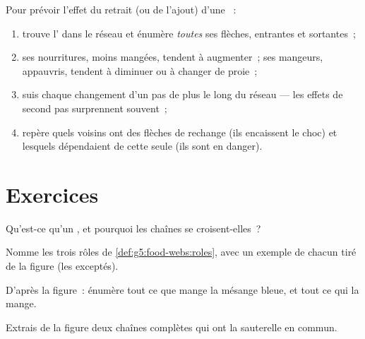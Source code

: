 \begin{method}\label{met:g5:food-webs:predict}
Pour prévoir l'effet du retrait (ou de l'ajout) d'une ~:
\begin{enumerate}
  \item trouve l' dans le réseau et énumère \emph{toutes} ses
        flèches, entrantes et sortantes~;
  \item ses nourritures, moins mangées, tendent à augmenter~; ses
        mangeurs, appauvris, tendent à diminuer ou à changer de
        proie~;
  \item suis chaque changement d'un pas de plus le long du réseau
        --- les effets de second pas surprennent souvent~;
  \item repère quels voisins ont des flèches de rechange (ils
        encaissent le choc) et lesquels dépendaient de cette seule
         (ils sont en danger).
\end{enumerate}
\end{method}

\section{Exercices}

\begin{exercise}[$\star$]\label{exo:g5:food-webs:1}
Qu'est-ce qu'un , et pourquoi les chaînes se
croisent-elles~?
\end{exercise}

\begin{exercise}[$\star$]\label{exo:g5:food-webs:2}
Nomme les trois rôles de \cref{def:g5:food-webs:roles}, avec un
exemple de chacun tiré de la figure (les  exceptés).
\end{exercise}

\begin{exercise}[$\star$]\label{exo:g5:food-webs:3}
D'après la figure~: énumère tout ce que mange la mésange bleue, et
tout ce qui la mange.
\end{exercise}

\begin{exercise}[$\star$]\label{exo:g5:food-webs:4}
Extrais de la figure deux chaînes complètes qui ont la sauterelle en
commun.
\end{exercise}

